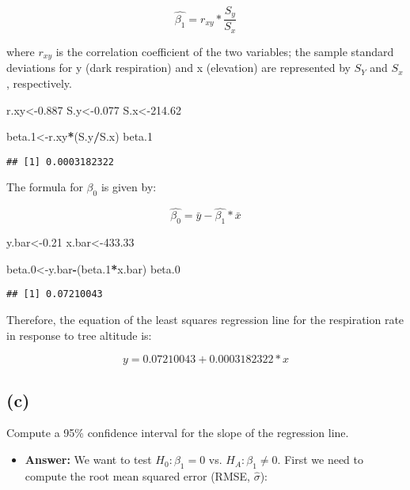 \documentclass[]{article}
\newenvironment{Shaded}{\begin{snugshade}}{\end{snugshade}}
\newcommand{\DecValTok}[1]{\textcolor[rgb]{0.00,0.00,0.81}{#1}}
\newcommand{\FloatTok}[1]{\textcolor[rgb]{0.00,0.00,0.81}{#1}}
\newcommand{\OperatorTok}[1]{\textcolor[rgb]{0.81,0.36,0.00}{\textbf{#1}}}
\newcommand{\NormalTok}[1]{#1}
\providecommand{\tightlist}{%
  \setlength{\itemsep}{0pt}\setlength{\parskip}{0pt}}
\begin{document}
\[
\hat{\beta_1} = r_{xy} * \frac{S_y}{S_x} 
\]

where \(r_{xy}\) is the correlation coefficient of the two variables;
the sample standard deviations for y (dark respiration) and x
(elevation) are represented by \(S_Y\) and \(S_x\), respectively.

\begin{Shaded}
\begin{Highlighting}[]
\NormalTok{r.xy<-}\FloatTok{0.887}
\NormalTok{S.y<-}\FloatTok{0.077}
\NormalTok{S.x<-}\FloatTok{214.62}

\NormalTok{beta.}\DecValTok{1}\NormalTok{<-r.xy}\OperatorTok{*}\NormalTok{(S.y}\OperatorTok{/}\NormalTok{S.x)}
\NormalTok{beta.}\DecValTok{1}
\end{Highlighting}
\end{Shaded}

\begin{verbatim}
## [1] 0.0003182322
\end{verbatim}

The formula for \(\beta_0\) is given by:

\[
\hat{\beta_0} = \bar{y} - \hat{\beta_1}*\bar{x}
\]

\begin{Shaded}
\begin{Highlighting}[]
\NormalTok{y.bar<-}\FloatTok{0.21}
\NormalTok{x.bar<-}\FloatTok{433.33}

\NormalTok{beta.}\DecValTok{0}\NormalTok{<-y.bar}\OperatorTok{-}\NormalTok{(beta.}\DecValTok{1}\OperatorTok{*}\NormalTok{x.bar)}
\NormalTok{beta.}\DecValTok{0}
\end{Highlighting}
\end{Shaded}

\begin{verbatim}
## [1] 0.07210043
\end{verbatim}

Therefore, the equation of the least squares regression line for the
respiration rate in response to tree altitude is:

\[
y = 0.07210043 + 0.0003182322*x
\]

\subsection{(c)}\label{c}

Compute a 95\% confidence interval for the slope of the regression line.

\begin{itemize}
\tightlist
\item
  \textbf{Answer:} We want to test \(H_0: \beta_1 = 0\) vs.
  \(H_A: \beta_1 \neq 0\). First we need to compute the root mean
  squared error (RMSE, \(\hat{\sigma}\)):
\end{itemize}
\end{document}
